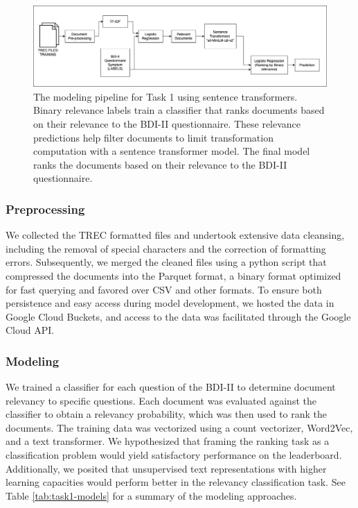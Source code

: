\documentclass[]{style/ceurart}
\begin{document}
\begin{figure}[h]
  \centering
  \includegraphics[width=\textwidth]{t1transformerspipeline.png}
  \caption{
    The modeling pipeline for Task 1 using sentence transformers.
    Binary relevance labels train a classifier that ranks documents based on their relevance to the BDI-II questionnaire.
    These relevance predictions help filter documents to limit transformation computation with a sentence transformer model.
    The final model ranks the documents based on their relevance to the BDI-II questionnaire.
  }
  \label{fig:pipeline}
\end{figure}  

\subsubsection{Preprocessing}

We collected the TREC formatted files and undertook extensive data cleansing, including the removal of special characters and the correction of formatting errors.
Subsequently, we merged the cleaned files using a python script that compressed the documents into the Parquet format, a binary format optimized for fast querying and favored over CSV and other formats.
To ensure both persistence and easy access during model development, we hosted the data in Google Cloud Buckets, and access to the data was facilitated through the Google Cloud API.

\subsubsection{Modeling}

We trained a classifier for each question of the BDI-II to determine document relevancy to specific questions.
Each document was evaluated against the classifier to obtain a relevancy probability, which was then used to rank the documents.
The training data was vectorized using a count vectorizer, Word2Vec, and a text transformer.
We hypothesized that framing the ranking task as a classification problem would yield satisfactory performance on the leaderboard.
Additionally, we posited that unsupervised text representations with higher learning capacities would perform better in the relevancy classification task.
See Table \ref{tab:task1-models} for a summary of the modeling approaches.
\end{document}
